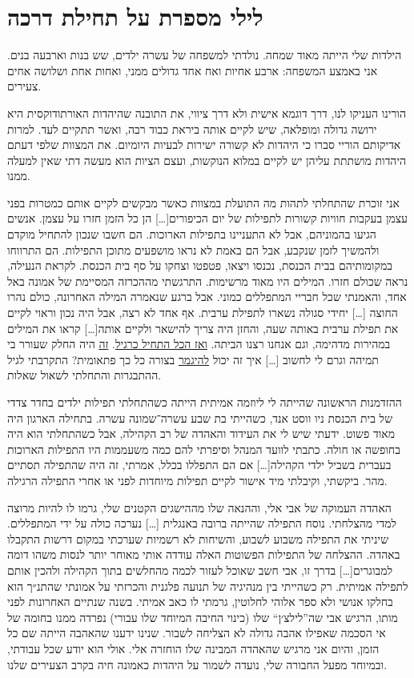 \documentclass[14pt, article, extrafontsizes, twopage, a4paper]{memoir}
\begin{document}
\chapter{לילי מספרת על תחילת דרכה}
  {\larger

הילדות שלי הייתה מאוד שמחה. נולדתי למשפחה של עשרה ילדים, שש בנות וארבעה בנים. אני באמצע המשפחה: ארבע אחיות ואח אחד גדולים ממני, ואחות אחת ושלושה אחים צעירים.

הורינו העניקו לנו, דרך דוגמא אישית ולא דרך ציווי, את התובנה שהיהדות האורתודוקסית היא ירושה גדולה ומופלאה, שיש לקיים אותה ביראת כבוד רבה, ואשר תתקיים לעד. למרות אדיקותם הוריי סברו כי היהדות לא קשורה ישירות לבעיות היומיום. את המצוות שלפי דעתם היהדות מושתתת עליהן יש לקיים במלוא הנוקשות, ועצם הציות הוא מעשה דתי שאין למעלה ממנו.

אני זוכרת שהתחלתי לתהות מה התועלת במצוות כאשר מבקשים לקיים אותם כמטרות בפני עצמן בעקבות חוויות קשורות לתפילות של יום הכיפורים[…] הן כל הזמן חזרו על עצמן. אנשים הגיעו בהמוניהם, אבל לא התעניינו בתפילות הארוכות. הם חשבו שנכון להתחיל מוקדם ולהמשיך לזמן שנקבע, אבל הם באמת לא נראו מושפעים מתוכן התפילות. הם התרווחו במקומותיהם בבית הכנסת, נכנסו ויצאו, פטפטו וצחקו על סף בית הכנסת. לקראת הנעילה, נראה שכולם חזרו. המילים היו מאוד מרשימות. התרגשתי מההכרזה המסיימת של אמונה באל אחד, והאמנתי שכל חבריי המתפללים כמוני.
אבל ברגע שנאמרה המילה האחרונה, כולם נהרו החוצה […] יחידי סגולה נשארו לתפילת ערבית. אף אחד לא רצה, אבל היה נכון וראוי לקיים את תפילת ערבית באותה שעה, והחזן היה צריך להישאר ולקיים אותה[…] קראו את המילים במהירות מדהימה, וגם אנחנו רצנו הביתה. \underline{ואז הכל התחיל כרגיל}. \underline{זה} היה החלק שעורר בי תמיהה וגרם לי לחשוב […] איך זה יכול \underline{להיגמר} בצורה כל כך פתאומית? התקרבתי לגיל ההתבגרות והתחלתי לשאול שאלות.

ההזדמנות הראשונה שהייתה לי ליוזמה אמיתית הייתה כשהתחלתי תפילות ילדים בחדר צדדי של בית הכנסת ניו ווסט אנד, כשהייתי בת שבע עשרה־שמונה עשרה. בתחילה הארגון היה מאוד פשוט. ידעתי שיש לי את העידוד והאהדה של רב הקהילה, אבל כשהתחלתי הוא היה בחופשה או חולה. כתבתי לוועד המנהל וסיפרתי להם כמה משעממות היו התפילות הארוכות בעברית בשביל ילדי הקהילה[…] אם הם התפללו בכלל, אמרתי, זה היה שהתפילה תסתיים מהר. ביקשתי, וקיבלתי מיד אישור לקיים תפילות מיוחדות לפני או אחרי התפילה הרגילה.

האהדה העמוקה של אבי אלי, וההנאה שלו מההישגים הקטנים שלי, גרמו לו להיות מרוצה למדי מהצלחתי. נוסח התפילה שהייתה ברובה באנגלית […] נערכה כולה על ידי המתפללים. שיניתי את התפילה משבוע לשבוע, והשיחות לא רשמיות שערכתי במקום דרשות התקבלו באהדה. ההצלחה של התפילות הפשוטות האלה עודדה אותי מאוחר יותר לנסות משהו דומה למבוגרים[…] בדרך זו, אבי חשב שאוכל לעזור לכמה מהחלשים בתוך הקהילה ולהכין אותם לתפילה אמיתית. רק כשהייתי בין מנהיגיה של תנועה פלגנית והכרזתי על אמונתי שהתנ״ך הוא בחלקו אנושי ולא ספר אלוהי לחלוטין, גרמתי לו כאב אמיתי. בשנה שנתיים האחרונות לפני מותו, הרגיש אבי שה”לילצ׳ן“ שלו (כינוי החיבה המיוחד שלו עבורי) נפרדה ממנו בחומה של אי הסכמה שאפילו אהבה גדולה לא הצליחה לשבור. שנינו ידענו שהאהבה הייתה שם כל הזמן, והיום אני מרגיש שהאהדה המבינה שלו הוחזרה אלי. אולי הוא יודע שכל עבודתי, ובמיוחד מפעל החבורה שלי, נועדה לשמור על היהדות כאמונה חיה בקרב הצעירים שלנו.

}
\end{document}
